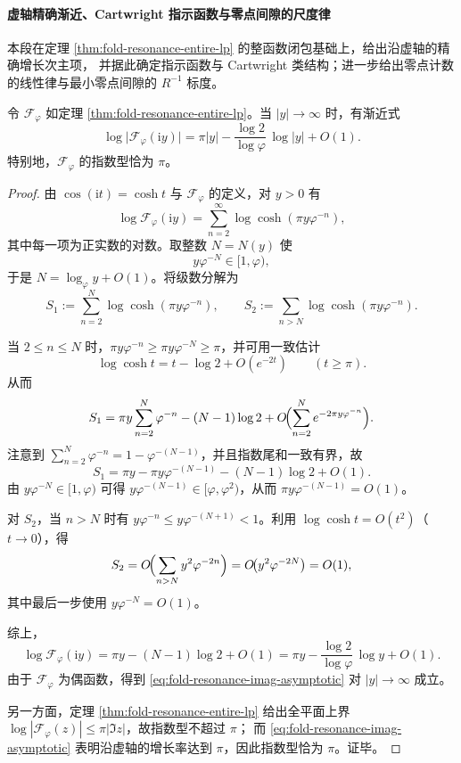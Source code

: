 \paragraph{虚轴精确渐近、Cartwright 指示函数与零点间隙的尺度律}
本段在定理 \ref{thm:fold-resonance-entire-lp} 的整函数闭包基础上，给出沿虚轴的精确增长次主项，
并据此确定指示函数与 Cartwright 类结构；进一步给出零点计数的线性律与最小零点间隙的 \(R^{-1}\) 标度。

\begin{theorem}[虚轴精确渐近与指数型的确定]\label{thm:fold-resonance-imag-asymptotic-type-pi}
令 \(\mathcal{F}_\varphi\) 如定理 \ref{thm:fold-resonance-entire-lp}。当 \(|y|\to\infty\) 时，有渐近式
\begin{equation}\label{eq:fold-resonance-imag-asymptotic}
\log\bigl|\mathcal{F}_\varphi(\mathrm{i}y)\bigr|
=\pi|y|-\frac{\log 2}{\log\varphi}\,\log|y|+O(1).
\end{equation}
特别地，\(\mathcal{F}_\varphi\) 的指数型恰为 \(\pi\)。
\end{theorem}

\begin{proof}
由 \(\cos(\mathrm{i}t)=\cosh t\) 与 \(\mathcal{F}_\varphi\) 的定义，对 \(y>0\) 有
\[
\log \mathcal{F}_\varphi(\mathrm{i}y)=\sum_{n=2}^{\infty}\log\cosh(\pi y\varphi^{-n}),
\]
其中每一项为正实数的对数。取整数 \(N=N(y)\) 使
\[
y\varphi^{-N}\in[1,\varphi),
\]
于是 \(N=\log_\varphi y+O(1)\)。将级数分解为
\[
S_1:=\sum_{n=2}^{N}\log\cosh(\pi y\varphi^{-n}),\qquad
S_2:=\sum_{n>N}\log\cosh(\pi y\varphi^{-n}).
\]

当 \(2\le n\le N\) 时，\(\pi y\varphi^{-n}\ge \pi y\varphi^{-N}\ge \pi\)，并可用一致估计
\[
\log\cosh t=t-\log 2+O(e^{-2t})\qquad (t\ge \pi).
\]
从而
\[
S_1
=\pi y\sum_{n=2}^{N}\varphi^{-n}-(N-1)\log 2
+O\!\Bigl(\sum_{n=2}^{N}e^{-2\pi y\varphi^{-n}}\Bigr).
\]
注意到 \(\sum_{n=2}^{N}\varphi^{-n}=1-\varphi^{-(N-1)}\)，并且指数尾和一致有界，故
\[
S_1=\pi y-\pi y\varphi^{-(N-1)}-(N-1)\log 2+O(1).
\]
由 \(y\varphi^{-N}\in[1,\varphi)\) 可得 \(y\varphi^{-(N-1)}\in[\varphi,\varphi^2)\)，从而 \(\pi y\varphi^{-(N-1)}=O(1)\)。

对 \(S_2\)，当 \(n>N\) 时有 \(y\varphi^{-n}\le y\varphi^{-(N+1)}<1\)。利用 \(\log\cosh t=O(t^2)\)（\(t\to 0\)），得
\[
S_2=O\!\Bigl(\sum_{n>N} y^2\varphi^{-2n}\Bigr)
=O\!\bigl(y^2\varphi^{-2N}\bigr)
=O(1),
\]
其中最后一步使用 \(y\varphi^{-N}=O(1)\)。

综上，
\[
\log \mathcal{F}_\varphi(\mathrm{i}y)
=\pi y-(N-1)\log 2+O(1)
=\pi y-\frac{\log 2}{\log\varphi}\,\log y+O(1).
\]
由于 \(\mathcal{F}_\varphi\) 为偶函数，得到 \eqref{eq:fold-resonance-imag-asymptotic} 对 \(|y|\to\infty\) 成立。

另一方面，定理 \ref{thm:fold-resonance-entire-lp} 给出全平面上界
\(\log|\mathcal{F}_\varphi(z)|\le \pi|\Im z|\)，故指数型不超过 \(\pi\)；
而 \eqref{eq:fold-resonance-imag-asymptotic} 表明沿虚轴的增长率达到 \(\pi\)，因此指数型恰为 \(\pi\)。证毕。
\end{proof}

